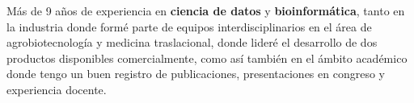 \documentclass[10pt,a4paper,ragged2e]{altacv}
\begin{document}

\begin{fullwidth}
\makecvheader
\end{fullwidth}



Más de 9 años de experiencia en \textbf{ciencia de datos} y \textbf{bioinformática}, tanto en la industria donde formé parte de equipos interdisciplinarios en el área de agrobiotecnología y medicina traslacional, donde lideré el desarrollo de dos productos disponibles comercialmente, como así también en el ámbito académico donde tengo un buen registro de publicaciones, presentaciones en congreso y experiencia docente. 



\medskip


\end{document}
